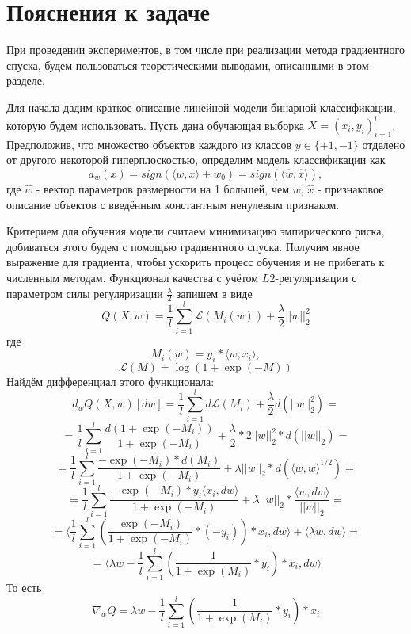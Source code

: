 \documentclass{article}
\begin{document}
\section{Пояснения к задаче}
    При проведении экспериментов, в том числе при реализации метода градиентного спуска, будем пользоваться теоретическими выводами, описанными в этом разделе.

    Для начала дадим краткое описание линейной модели бинарной классификации, которую будем использовать. Пусть дана обучающая выборка $X = (x_i, y_i)_{i=1}^l$. Предположив, что множество объектов каждого из классов $y \in \{+1, -1\}$ отделено от другого некоторой гиперплоскостью, определим модель классификации как
    $$a_w(x) = sign(\langle w, x \rangle + w_0) = sign(\langle \hat{w}, \hat{x} \rangle),$$ где $\hat{w}$ - вектор параметров размерности на 1 большей, чем $w$, $\hat{x}$ - признаковое описание объектов с введённым константным ненулевым признаком.

    Критерием для обучения модели считаем минимизацию эмпирического риска, добиваться этого будем с помощью градиентного спуска. Получим явное выражение для градиента, чтобы ускорить процесс обучения и не прибегать к численным методам. Функционал качества с учётом $L2$-регуляризации с параметром силы регуляризации $\frac{\lambda}{2}$ запишем в виде
    \begin{equation} \label{eq:1}
        Q(X, w) = \frac{1}{l} \sum_{i=1}^{l}\mathcal{L}(M_i(w)) + \frac{\lambda}{2} ||w||^2_2
    \end{equation}
    где
    $$ M_i(w) = y_i * \langle w, x_i \rangle, $$
    $$ \mathcal{L}(M) = \log{(1 + \exp{(-M)})}$$
    Найдём дифференциал этого функционала:
    $$ d_wQ(X, w)[dw] = \frac{1}{l} \sum_{i=1}^{l}d\mathcal{L}(M_i) + \frac{\lambda}{2} d(||w||^2_2) = $$
    $$ = \frac{1}{l} \sum_{i=1}^{l}\frac{d(1 + \exp{(-M_i)})}{1 + \exp{(-M_i)}} + \frac{\lambda}{2} * 2||w||^2_2*d(||w||_2) = $$
    $$ = \frac{1}{l} \sum_{i=1}^{l}\frac{-\exp{(-M_i)}*d(M_i)}{1 + \exp{(-M_i)}} + \lambda||w||_2*d(\langle w, w \rangle^{1/2} ) = $$
    $$ = \frac{1}{l} \sum_{i=1}^{l}\frac{-\exp{(-M_i)}*y_i \langle x_i, dw \rangle}{1 + \exp{(-M_i)}} + \lambda||w||_2 * \frac{\langle w, dw \rangle}{||w||_2} = $$
    $$ = \langle \frac{1}{l} \sum_{i=1}^{l}(\frac{\exp{(-M_i)}}{1 + \exp{(-M_i)}} * (-y_i)) * x_i, dw \rangle +  \langle \lambda w, dw \rangle = $$
    $$ = \langle \lambda w - \frac{1}{l} \sum_{i=1}^{l}(\frac{1}{1 + \exp{(M_i)}} * y_i) * x_i, dw \rangle $$
    То есть
    \begin{equation} \label{eq:2}
        \nabla_w Q = \lambda w - \frac{1}{l} \sum_{i=1}^{l}(\frac{1}{1 + \exp{(M_i)}} * y_i) * x_i
    \end{equation}
\end{document}
